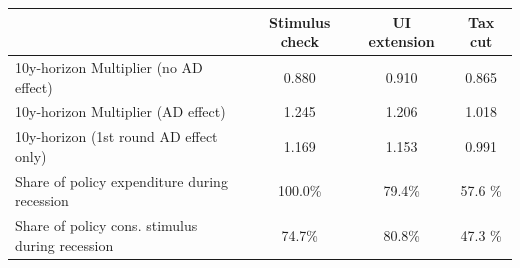 \begin{tabular}{@{}lccc@{}} 
\toprule 
& Stimulus check    & UI extension    & Tax cut     \\  \midrule 
10y-horizon Multiplier (no AD effect) &0.880  & 0.910  & 0.865     \\ 
10y-horizon Multiplier (AD effect) &1.245  & 1.206  & 1.018     \\ 
10y-horizon (1st round AD effect only) &1.169  & 1.153  & 0.991     \\ 
Share of policy expenditure during recession &100.0\%  & 79.4\%  & 57.6 \%    \\ 
Share of policy cons. stimulus during recession &74.7\%  & 80.8\%  & 47.3 \%    \\ \bottomrule 
\end{tabular}  
